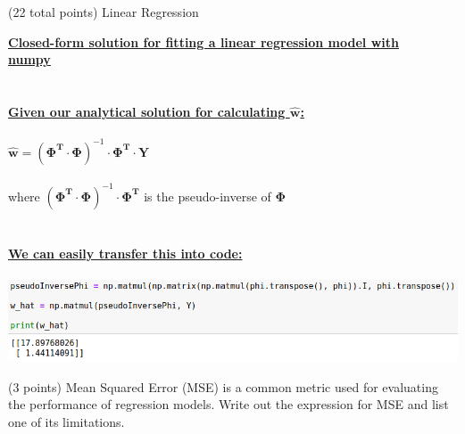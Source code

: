 \documentclass[12pt]{article}
\begin{document}
\begin{question}{(22 total points) Linear Regression}
\begin{subquestion}
\begin{answerbox}{24em}
\large{\textbf{\underline{Closed-form solution for fitting a linear regression model with}}}\\
\large{\textbf{\underline{numpy}}}\\
\\
\\
\normalsize{
\textbf{\underline{Given our analytical solution for calculating $\hat{\mathbf{w}}$:}}\\
\\
$\hat{\mathbf{w}} = (\mathbf{\Phi^{T}}\cdot\mathbf{\Phi})^{-1}\cdot\mathbf{\Phi^{T}}\cdot \mathbf{Y}$\\
\\
where $(\mathbf{\Phi^{T}}\cdot\mathbf{\Phi})^{-1}\cdot\mathbf{\Phi^{T}}$ is the pseudo-inverse of $\mathbf{\Phi}$
\\
\\
\\
\textbf{\underline{We can easily transfer this into code:}}\\
\\
\includegraphics [width=1\textwidth]{images/q1d-code.png}
}
\end{answerbox}



\end{subquestion}



%
%
\begin{subquestion}{(3 points) Mean Squared Error (MSE) is a common metric used for evaluating the performance of regression models. 
Write out the expression for MSE and list one of its limitations. \\
}



\end{subquestion}
\end{question}
\end{document}
